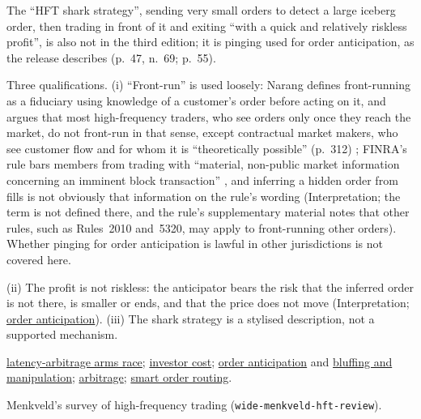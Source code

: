 \begin{qfdefinition}
The ``HFT shark strategy'', sending very small orders to detect a large iceberg order, then trading in front of it and exiting ``with a quick and relatively riskless profit'', is also not in the third edition; it is pinging used for order anticipation, as the release describes (p.~47, n.~69; p.~55).

Three qualifications. (i) ``Front-run'' is used loosely: Narang defines front-running as a fiduciary using knowledge of a customer's order before acting on it, and argues that most high-frequency traders, who see orders only once they reach the market, do not front-run in that sense, except contractual market makers, who see customer flow and for whom it is ``theoretically possible'' (p.~312) \citep[Appendix, sec.~A.2.1, pp.~312--314]{s7-narang}; FINRA's rule bars members from trading with ``material, non-public market information concerning an imminent block transaction'' \citep[para.~(a)]{finra-rule-5270}, and inferring a hidden order from fills is not obviously that information on the rule's wording (Interpretation; the term is not defined there, and the rule's supplementary material notes that other rules, such as Rules~2010 and~5320, may apply to front-running other orders). Whether pinging for order anticipation is lawful in other jurisdictions is not covered here.

(ii) The profit is not riskless: the anticipator bears the risk that the inferred order is not there, is smaller or ends, and that the price does not move (Interpretation; \hyperref[def:order-anticipation]{order anticipation}). (iii) The shark strategy is a stylised description, not a supported mechanism.

 \hyperref[res:latency-arbitrage-arms-race]{latency-arbitrage arms race}; \hyperref[res:hft-spread-investor-cost]{investor cost}; \hyperref[def:order-anticipation]{order anticipation} and \hyperref[def:bluffing-manipulation]{bluffing and manipulation}; \hyperref[def:arbitrage]{arbitrage}; \hyperref[def:smart-order-routing]{smart order routing}.

 Menkveld's survey of high-frequency trading (\nolinkurl{wide-menkveld-hft-review}).

\end{qfdefinition}

